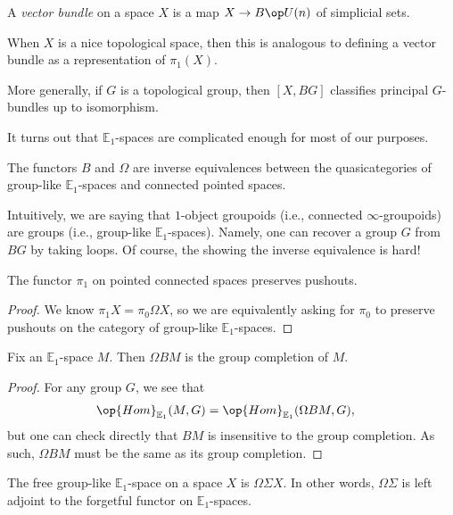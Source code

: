 \documentclass[../notes.tex]{subfiles}
\begin{document}
\begin{definition}
	A \textit{vector bundle} on a space $X$ is a map $X\to B\op U(n)$ of simplicial sets.
\end{definition}
\begin{remark}
	When $X$ is a nice topological space, then this is analogous to defining a vector bundle as a representation of $\pi_1(X)$.
\end{remark}
\begin{remark}
	More generally, if $G$ is a topological group, then $[X,BG]$ classifies principal $G$-bundles up to isomorphism.
\end{remark}
It turns out that $\mathbb E_1$-spaces are complicated enough for most of our purposes.
\begin{theorem} \label{thm:one-object-groupoid}
	The functors $B$ and $\Omega$ are inverse equivalences between the quasicategories of group-like $\mathbb E_1$-spaces and connected pointed spaces.
\end{theorem}
\begin{remark}
	Intuitively, we are saying that $1$-object groupoids (i.e., connected $\infty$-groupoids) are groups (i.e., group-like $\mathbb E_1$-spaces). Namely, one can recover a group $G$ from $BG$ by taking loops. Of course, the showing the inverse equivalence is hard!
\end{remark}
\begin{corollary}
	The functor $\pi_1$ on pointed connected spaces preserves pushouts.
\end{corollary}
\begin{proof}
	We know $\pi_1X=\pi_0\Omega X$, so we are equivalently asking for $\pi_0$ to preserve pushouts on the category of group-like $\mathbb E_1$-spaces.
\end{proof}
\begin{corollary}
	Fix an $\mathbb E_1$-space $M$. Then $\Omega BM$ is the group completion of $M$.
\end{corollary}
\begin{proof}
	For any group $G$, we see that
	\begin{align*}
		\op{Hom}_{\mathbb E_1}(M,G) &= \op{Hom}_{\mathbb E_1}(\Omega BM,G),
	\end{align*}
	but one can check directly that $BM$ is insensitive to the group completion. As such, $\Omega BM$ must be the same as its group completion.
\end{proof}
\begin{corollary}
	The free group-like $\mathbb E_1$-space on a space $X$ is $\Omega\Sigma X$. In other words, $\Omega\Sigma$ is left adjoint to the forgetful functor on $\mathbb E_1$-spaces.
\end{corollary}
\end{document}
